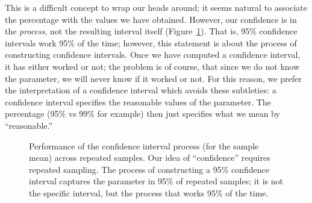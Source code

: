 \documentclass[
  letterpaper,
  DIV=11,
  numbers=noendperiod]{scrreprt}
\theoremstyle{definition}
\theoremstyle{definition}
\theoremstyle{plain}
\theoremstyle{remark}
\begin{document}
This is a difficult concept to wrap our heads around; it seems natural
to associate the percentage with the values we have obtained. However,
our confidence is in the \emph{process}, not the resulting interval
itself (Figure~\ref{fig-samplingdistns-ci-process}). That is, 95\%
confidence intervals work 95\% of the time; however, this statement is
about the process of constructing confidence intervals. Once we have
computed a confidence interval, it has either worked or not; the problem
is of course, that since we do not know the parameter, we will never
know if it worked or not. For this reason, we prefer the interpretation
of a confidence interval which avoids these subtleties: a confidence
interval specifies the reasonable values of the parameter. The
percentage (95\% vs 99\% for example) then just specifies what we mean
by ``reasonable.''

\begin{figure}


\caption{\label{fig-samplingdistns-ci-process}Performance of the
confidence interval process (for the sample mean) across repeated
samples. Our idea of ``confidence'' requires repeated sampling. The
process of constructing a 95\% confidence interval captures the
parameter in 95\% of repeated samples; it is not the specific interval,
but the process that works 95\% of the time.}

\end{figure}%
\end{document}
